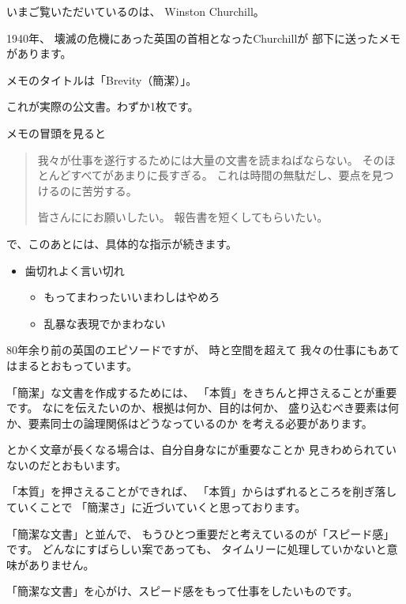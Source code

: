 \documentclass[uplatex,jis2004,dvipdfmx,12pt]{jsarticle}
\begin{document}
いまご覧いただいているのは、
Winston Churchill。

1940年、
壊滅の危機にあった英国の首相となったChurchillが
部下に送ったメモがあります。

メモのタイトルは「Brevity（簡潔）」。

これが実際の公文書。わずか1枚です。

メモの冒頭を見ると

\begin{quote}
我々が仕事を遂行するためには大量の文書を読まねばならない。
そのほとんどすべてがあまりに長すぎる。
これは時間の無駄だし、要点を見つけるのに苦労する。

皆さんににお願いしたい。
報告書を短くしてもらいたい。
\end{quote}

で、このあとには、具体的な指示が続きます。
\begin{itemize}
 \item 歯切れよく言い切れ
       \begin{itemize}
       \item もってまわったいいまわしはやめろ
       \item 乱暴な表現でかまわない
       \end{itemize}

\end{itemize}




80年余り前の英国のエピソードですが、
時と空間を超えて
我々の仕事にもあてはまるとおもっています。


「簡潔」な文書を作成するためには、
「本質」をきちんと押さえることが重要です。
なにを伝えたいのか、根拠は何か、目的は何か、
盛り込むべき要素は何か、要素同士の論理関係はどうなっているのか
を考える必要があります。

とかく文章が長くなる場合は、自分自身なにが重要なことか
見きわめられていないのだとおもいます。

「本質」を押さえることができれば、
「本質」からはずれるところを削ぎ落していくことで
「簡潔さ」に近づいていくと思っております。

「簡潔な文書」と並んで、
もうひとつ重要だと考えているのが「スピード感」です。
どんなにすばらしい案であっても、
タイムリーに処理していかないと意味がありません。

「簡潔な文書」を心がけ、スピード感をもって仕事をしたいものです。
\end{document}
